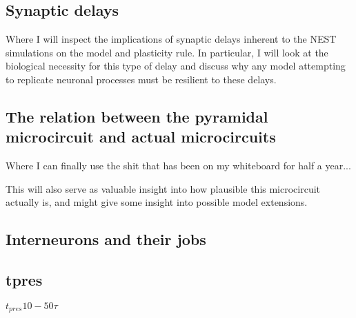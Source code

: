 \subsection{Synaptic delays}

Where I will inspect the implications of synaptic delays inherent to the NEST simulations on the model and plasticity
rule. In particular, I will look at the biological necessity for this type of delay and discuss why any model attempting
to replicate neuronal processes must be resilient to these delays.


\subsection{The relation between the pyramidal microcircuit and actual microcircuits}

Where I can finally use the shit that has been on my whiteboard for half a year...

This will also serve as valuable insight into how plausible this microcircuit actually is, and might give some insight
into possible model extensions.

\subsection{Interneurons and their jobs}

\subsection{tpres}

$t_{pres} 10 - 50 \tau$
